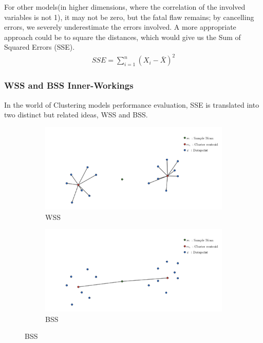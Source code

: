 \documentclass[11pt]{article}
\begin{document}
				\fi
				For other models(in higher dimensions, where the correlation of the involved variables is not 1), it may not be zero, but the fatal flaw remains; by cancelling errors, we severely underestimate the errors involved. A more appropriate approach could be to square the distances, which would give us the Sum of Squared Errors (SSE).\\
				\iftrue
				\begin{align}
					SSE = \sum_{i=1}^{n}{(X_i-\bar{X})}^2
				\end{align}
				\fi
			\subsubsection*{WSS and BSS Inner-Workings}
				In the world of Clustering models performance evaluation, SSE is translated into two distinct but related ideas, WSS and BSS.
				\iftrue
				\begin{figure}[H]
					\centering
					\begin{subfigure}{0.4\textwidth}
						\includegraphics[width=\textwidth]{res/t1/t15/t15-WSS}
						\caption{WSS}
						\label{fig:first}
					\end{subfigure}
					\hfill
					\begin{subfigure}{0.4\textwidth}
						\includegraphics[width=\textwidth]{res/t1/t15/t15-BSS}
						\caption{BSS}
						\label{fig:second}
					\end{subfigure}
					\hfill
					\label{fig:figures}
				\end{figure}
				\fi
\end{document}
